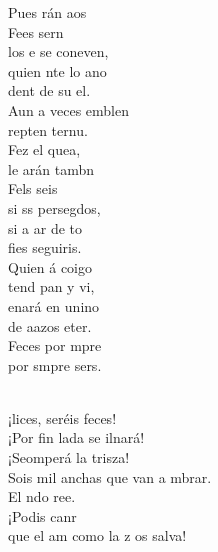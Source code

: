 \documentclass[12pt]{article}
\begin{document}
\begin{multicols*}{2}
\begin{cancion}
	Pues rán aos\\
\jump
	Fees sern\\
	los e se coneven,\\
	quien nte lo ano\\
	dent de su el.\\
	Aun a veces emblen\\
	repten ternu.\\
	Fez el quea,\\
	le arán tambn\\
\jump
	Fels seis \\
	si ss persegdos,\\
	si a ar de to\\
	fies seguiris.\\
	Quien á coigo\\
	tend pan y vi,  \\
	enará en unino\\
	de aazos eter.\\
	Feces por mpre\\
	por smpre sers.\\\jump\\
	\begin{chorus}%
	¡lices, seréis feces! \\
	¡Por fin lada se ilnará!\\
	¡Seomperá la trisza!\\
	Sois mil anchas que van a mbrar.\\
	El ndo ree.\\
	¡Podis canr\\
	que el am como la z os salva!\\
	\end{chorus}%

\end{cancion}
\end{multicols*}
\end{document}
